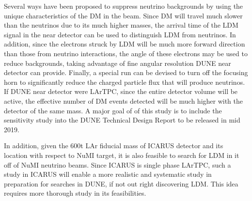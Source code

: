Several ways have been proposed to suppress neutrino backgrounds by using the unique characteristics of the DM in the beam. Since DM will travel much slower than the neutrinos due to its much higher masses, the arrival time of the LDM signal in the near detector can be used to distinguish LDM from neutrinos.  In addition, since the electrons struck by LDM will be much more forward direction than those from neutrino interactions, the angle of these electrons may be used to reduce backgrounds, taking advantage of fine angular resolution DUNE near detector can provide. Finally, a special run can be devised to turn off the focusing horn to significantly reduce the charged particle flux that will produce neutrinos. If DUNE near detector were LArTPC, since the entire detector volume will be active, the effective number of DM events detected will be much higher with the detector of the same mass. A major goal of of this study is to include the sensitivity study into the DUNE Technical Design Report to be released in mid 2019.

In addition, given the 600t LAr fiducial mass of ICARUS detector and its location with respect to NuMI target, it is also feasible to search for LDM in it off of NuMI neutrino beams.  Since ICARUS is single phase LArTPC, such a study in ICARUS will enable a more realistic and systematic study in preparation for searches in DUNE, if not out right discovering LDM.  This idea requires more thorough study in its feasibilities.


